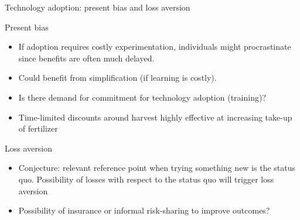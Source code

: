 \documentclass[aspectratio=169, 10pt, handout]{beamer}
\newenvironment{wideitemize}{\itemize\addtolength{\itemsep}{10pt}}{\enditemize}
\begin{document}
\begin{frame}{Technology adoption: present bias and loss aversion}

\begin{wideitemize}

	\item Present bias \citep{duflo2011nudging}
	
	\begin{itemize}
	
		\item If adoption requires costly experimentation, individuals might procrastinate since benefits are often much delayed.
		
		\item Could benefit from simplification (if learning is costly). 

		\item Is there demand for commitment for technology adoption (training)? 
		
		\item Time-limited discounts around harvest highly effective at increasing take-up of fertilizer
		
	\end{itemize}

	\item Loss aversion

	\begin{itemize}

		\item Conjecture: relevant reference point when trying something new is the status quo. Possibility of losses with respect to the status quo will trigger loss aversion
		
		\item Possibility of insurance or informal risk-sharing to improve outcomes? 

	\end{itemize}
	
\end{wideitemize}

\end{frame}
\end{document}
